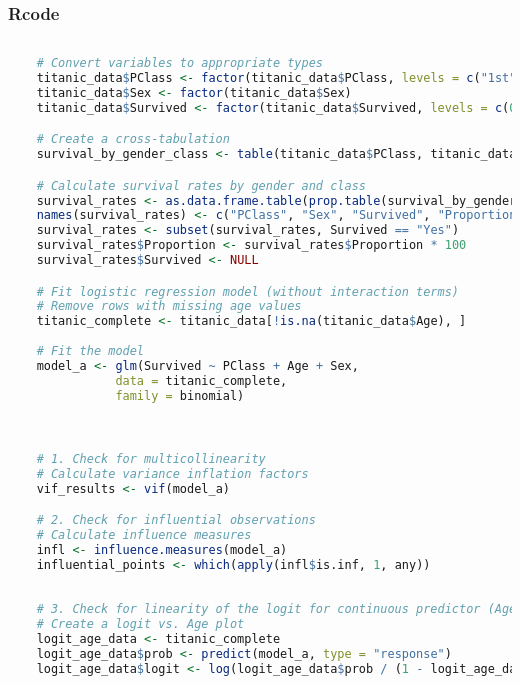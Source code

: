 \documentclass{article}
\begin{document}
\subsubsection{Rcode}
\begin{lstlisting}[language=R, breaklines=true, keywordstyle=\color{magenta},
    numberstyle=\tiny\color{codegray},
    stringstyle=\color{codepurple},
    aboveskip=0pt, belowskip=0pt,
    xleftmargin=0pt,
    basicstyle=\ttfamily\footnotesize,
    xrightmargin=0pt]
    
    # Convert variables to appropriate types
    titanic_data$PClass <- factor(titanic_data$PClass, levels = c("1st", "2nd", "3rd"))
    titanic_data$Sex <- factor(titanic_data$Sex)
    titanic_data$Survived <- factor(titanic_data$Survived, levels = c(0, 1), labels = c("No", "Yes"))

    # Create a cross-tabulation
    survival_by_gender_class <- table(titanic_data$PClass, titanic_data$Sex, titanic_data$Survived)

    # Calculate survival rates by gender and class
    survival_rates <- as.data.frame.table(prop.table(survival_by_gender_class, margin = c(1, 2)))
    names(survival_rates) <- c("PClass", "Sex", "Survived", "Proportion")
    survival_rates <- subset(survival_rates, Survived == "Yes")
    survival_rates$Proportion <- survival_rates$Proportion * 100
    survival_rates$Survived <- NULL

    # Fit logistic regression model (without interaction terms)
    # Remove rows with missing age values
    titanic_complete <- titanic_data[!is.na(titanic_data$Age), ]
    
    # Fit the model
    model_a <- glm(Survived ~ PClass + Age + Sex, 
               data = titanic_complete, 
               family = binomial)


    
    # 1. Check for multicollinearity
    # Calculate variance inflation factors
    vif_results <- vif(model_a)

    # 2. Check for influential observations
    # Calculate influence measures
    infl <- influence.measures(model_a)
    influential_points <- which(apply(infl$is.inf, 1, any))
    
    
    # 3. Check for linearity of the logit for continuous predictor (Age)
    # Create a logit vs. Age plot
    logit_age_data <- titanic_complete
    logit_age_data$prob <- predict(model_a, type = "response")
    logit_age_data$logit <- log(logit_age_data$prob / (1 - logit_age_data$prob))
    

\end{lstlisting}
\end{document}
